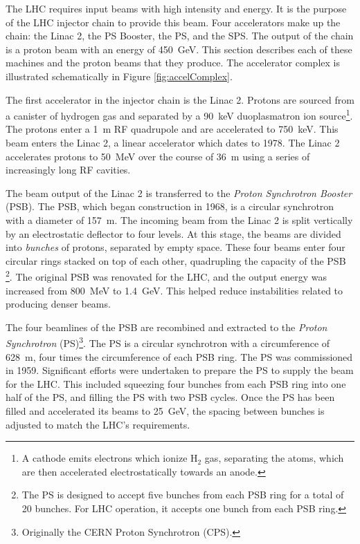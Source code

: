 The LHC requires input beams with high intensity and energy.
It is the purpose of the LHC injector chain to provide this beam.
Four accelerators make up the chain: the Linac 2, the PS Booster, the PS, and the SPS.
The output of the chain is a proton beam with an energy of 450~GeV.
This section describes each of these machines and the proton beams that they produce.\cite{schindl}
The accelerator complex is illustrated schematically in Figure \ref{fig:accelComplex}.

The first accelerator in the injector chain is the Linac 2.
Protons are sourced from a canister of hydrogen gas and separated by a 90~keV duoplasmatron ion source\footnote{A cathode emits electrons which ionize H$_2$ gas, separating the atoms, which are then accelerated electrostatically towards an anode.}.
The protons enter a 1~m RF quadrupole and are accelerated to 750~keV.
This beam enters the Linac 2, a linear accelerator which dates to 1978.
The Linac 2 accelerates protons to 50~MeV over the course of 36~m using a series of increasingly long RF cavities. \cite{manglunki}

The beam output of the Linac 2 is transferred to the \emph{Proton Synchrotron Booster} (PSB).
The PSB, which began construction in 1968, is a circular synchrotron with a diameter of 157~m.
The incoming beam from the Linac 2 is split vertically by an electrostatic deflector to four levels.
At this stage, the beams are divided into \emph{bunches} of protons, separated by empty space.
These four beams enter four circular rings stacked on top of each other, quadrupling the capacity of the PSB \footnote{The PS is designed to accept five bunches from each PSB ring for a total of 20 bunches. For LHC operation, it accepts one bunch from each PSB ring.}. \cite{reich}
The original PSB was renovated for the LHC, and the output energy was increased from 800~MeV to 1.4~GeV. 
This helped reduce instabilities related to producing denser beams.
\cite{schindl}

The four beamlines of the PSB are recombined and extracted to the \emph{Proton Synchrotron} (PS)\footnote{Originally the CERN Proton Synchrotron (CPS).}.
The PS is a circular synchrotron with a circumference of 628~m, four times the circumference of each PSB ring. 
The PS was commissioned in 1959.
Significant efforts were undertaken to prepare the PS to supply the beam for the LHC.
This included squeezing four bunches from each PSB ring into one half of the PS, and filling the PS with two PSB cycles.
Once the PS has been filled and accelerated its beams to 25~GeV, the spacing between bunches is adjusted to match the LHC's requirements.\cite{schindl}

